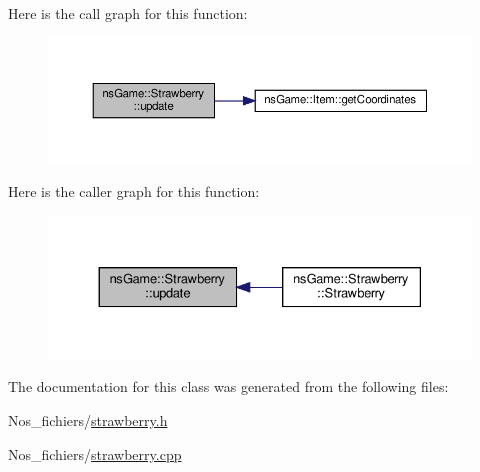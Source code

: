 Here is the call graph for this function\+:
\nopagebreak
\begin{figure}[H]
\begin{center}
\leavevmode
\includegraphics[width=350pt]{classns_game_1_1_strawberry_a67f6d787f200bc7202b4ede2bde2b9ac_cgraph}
\end{center}
\end{figure}
Here is the caller graph for this function\+:
\nopagebreak
\begin{figure}[H]
\begin{center}
\leavevmode
\includegraphics[width=330pt]{classns_game_1_1_strawberry_a67f6d787f200bc7202b4ede2bde2b9ac_icgraph}
\end{center}
\end{figure}


The documentation for this class was generated from the following files\+:\begin{DoxyCompactItemize}
\item 
Nos\+\_\+fichiers/\hyperlink{strawberry_8h}{strawberry.\+h}\item 
Nos\+\_\+fichiers/\hyperlink{strawberry_8cpp}{strawberry.\+cpp}\end{DoxyCompactItemize}

